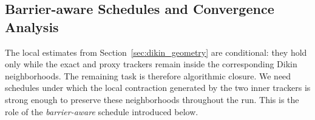 \documentclass{article}
\begin{document}
\subsection{Barrier-aware Schedules and Convergence Analysis}
\label{subsec:tube_and_conv}

\newcommand{\Cd}{(\ell_{f,0}/\lambda_0+2\ell_{g,0})}

The local estimates from Section~\ref{sec:dikin_geometry} are conditional: they hold only while the
exact and proxy trackers remain inside the corresponding Dikin neighborhoods. The remaining task is
therefore algorithmic closure. We need schedules under which the local contraction generated by the
two inner trackers is strong enough to preserve these neighborhoods throughout the run. This is the
role of the \textit{barrier-aware} schedule introduced below.
\end{document}

